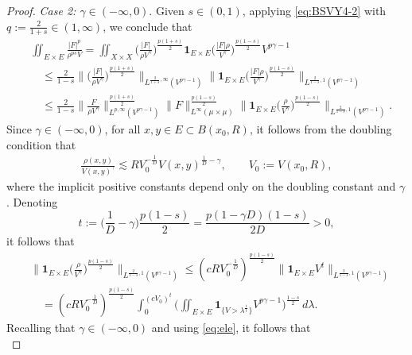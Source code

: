 \documentclass[10pt,a4paper]{amsart}
\newcommand{\BNorm}[2]{\Big\|#1\Big\|_{#2}}
\newcommand{\Norm}[2]{\|#1\|_{#2}}
\begin{document}
\begin{proof}
\emph{Case 2: $\gamma\in(-\infty,0)$}.
Given $s\in(0,1)$, applying \eqref{eq:BSVY4-2} with
$q:=\frac{2}{1+s}\in(1,\infty)$,
we conclude that
\begin{equation}
\begin{split}
&\iint_{E\times E}\frac{|F|^p}{\rho^{ps}V}%
=\iint_{X\times X}\Big(\frac{|F|}{\rho V^\gamma}\Big)^{\frac{p(1+s)}{2}}
\mathbf{1}_{E\times E}\Big(\frac{|F| \rho}{V^\gamma}\Big)^{\frac{p(1-s)}{2}}
V^{p\gamma-1}\\
&\quad\le \frac{2}{1-s}
\BNorm{\Big(\frac{|F|}{\rho V^\gamma}\Big)^{\frac{p(1+s)}{2}}}{
L^{\frac{2}{1+s},\infty} (V^{p\gamma-1})}%
\BNorm{\mathbf{1}_{E\times E}\Big(\frac{|F| \rho}{V^\gamma}\Big)^{\frac{p(1-s)}{2}}}{
L^{\frac{2}{1-s},1} (V^{p\gamma-1})}\\
&\quad\le \frac{2}{1-s}
\BNorm{\frac{F}{\rho V^\gamma}}{
L^{p,\infty} (V^{p\gamma-1})}^{\frac{p(1+s)}{2}}\Norm{F}{L^\infty(\mu\times\mu)}
^{\frac{p(1-s)}{2}}%
\BNorm{\mathbf{1}_{E\times E}\Big(\frac{\rho}{V^\gamma}\Big)^{\frac{p(1-s)}{2}}}{
L^{\frac{2}{1-s},1} (V^{p\gamma-1})}.
\end{split}
\end{equation}
Since $\gamma\in(-\infty,0)$, for all $x,y\in E\subset B(x_0,R)$,
it follows from the doubling condition that
\begin{align*}
\frac{\rho(x,y)}{V(x,y)^\gamma}
\lesssim RV_0^{-\frac1D}V(x,y)^{\frac1D-\gamma},
\qquad
V_0:=V(x_0,R),
\end{align*}
where the implicit positive constants depend only on the doubling constant and $\gamma$.
Denoting
\begin{equation*}
  t:=\Big(\frac 1D-\gamma\Big)\frac{p(1-s)}{2}=\frac{p(1-\gamma D)(1-s)}{2D}>0,
\end{equation*}
it follows that
\begin{align*}
  &\BNorm{\mathbf{1}_{E\times E}\Big(\frac{\rho}{V^\gamma}\Big)^{\frac{p(1-s)}{2}}}{
  L^{\frac{2}{1-s},1} (V^{p\gamma-1})}
  \leq (cRV_0^{-\frac{1}{D}})^{\frac{p(1-s)}{2}}
  \BNorm{\mathbf{1}_{E\times E} V^t}{L^{\frac{2}{1-s},1}(V^{p\gamma-1})} \\
  &\quad=(cRV_0^{-\frac{1}{D}})^{\frac{p(1-s)}{2}}\int_{0}^{(cV_0)^t}
  \Big(\iint_{E\times E}\mathbf{1}_{\{V>\lambda^{\frac 1t}\}}
  V^{p\gamma-1}\Big)^{\frac{1-s}{2}}\,d\lambda.
\end{align*}
Recalling that $\gamma\in(-\infty,0)$ and using \eqref{eq:ele}, it follows that
\begin{equation*}

\end{equation*}
\end{proof}
\end{document}
